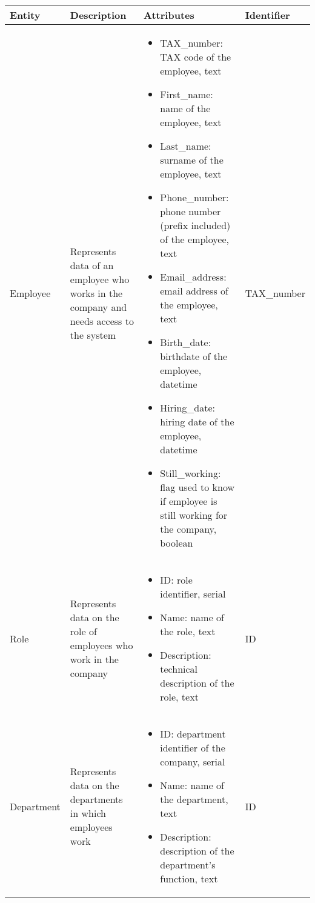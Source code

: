 \begin{longtable}{|p{}|p{} |p{}|p{} |}
    \hline
    \textbf{Entity} & \textbf{Description} & \textbf{Attributes} & \textbf{Identifier}  \\\hline

    Employee & Represents data of an employee who works in the company and needs access to the system &
    \begin{itemize}
        \vspace{-1em}
        \item TAX\_number:   TAX code of the employee, text
        \item First\_name:   name of the employee, text
        \item Last\_name:   surname of the employee, text
        \item Phone\_number:   phone number (prefix included) of the employee, text
        \item Email\_address:   email address of the employee, text
        \item Birth\_date:   birthdate of the employee, datetime
        \item Hiring\_date:   hiring date of the employee, datetime
        \item Still\_working: flag used to know if employee is still working for the company, boolean
    \end{itemize}
    &  TAX\_number \\\hline

    Role & Represents data on the role of employees who work in the company &
    \begin{itemize}
        \vspace{-1em}
        \item ID:   role identifier, serial
        \item Name:   name of the role, text
        \item Description:   technical description of the role, text
    \end{itemize}
    &  ID \\\hline

    Department & Represents data on the departments in which employees work &
    \begin{itemize}
        \vspace{-1em}
        \item ID:   department identifier of the company, serial
        \item Name:   name of the department, text
        \item Description:   description of the department's function, text
    \end{itemize}
    &  ID \\\hline


\end{longtable}
